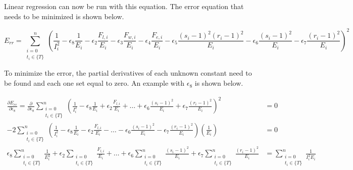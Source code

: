Linear regression can now be run with this equation. The error equation that needs to be minimized is shown below.

\begin{equation*}
	E_{rr}=\sum_{
            \substack{i=0\\ t_i\in \{ T \}}
        }^n \left(
        \frac{1}{I_i^2}
        -\epsilon_8 \frac{1}{E_i}
        -\epsilon_2 \frac{F_{l,i}}{E_i}
        -\epsilon_3 \frac{F_{w,i}}{E_i}
        -\epsilon_4 \frac{F_{e,i}}{E_i}
        -\epsilon_5 \frac{(s_i-1)^2(r_i-1)^2}{E_i}
        -\epsilon_6 \frac{(s_i-1)^2}{E_i}
        -\epsilon_7 \frac{(r_i-1)^2}{E_i}
    \right)^2
\end{equation*}

To minimize the error, the partial derivatives of each unknown constant need to be found and each one set equal to zero. An example with $\epsilon_8$ is shown below.

\begin{equation*}
    \begin{split}
        \frac{\partial E_{rr}}{\partial \epsilon_8}=
        \frac{\partial}{\partial \epsilon_8}\sum_{
                \substack{i=0\\ t_i\in \{ T \}}
            }^n \left(
            \frac{1}{I_i^2}
            -\epsilon_8 \frac{1}{E_i}
            +\epsilon_2 \frac{F_{l,i}}{E_i}
            +\dots
            +\epsilon_6 \frac{(s_i-1)^2}{E_i}
            +\epsilon_7 \frac{(r_i-1)^2}{E_i}
        \right)^2&=0
        \\
        -2\sum_{
                \substack{i=0\\ t_i\in \{ T \}}
            }^n \left(
            \frac{1}{I_i^2}
            -\epsilon_8 \frac{1}{E_i}
            -\epsilon_2 \frac{F_{l,i}}{E_i}
            -\dots
            -\epsilon_6 \frac{(s_i-1)^2}{E_i}
           	-\epsilon_7 \frac{(r_i-1)^2}{E_i}
        \right)\left( \frac{1}{E_i} \right)&=0 
        \\
        \epsilon_8 \sum_{\substack{i=0\\ t_i\in \{ T \}}}^n \frac{1}{E_i^2} 
        +\epsilon_2 \sum_{\substack{i=0\\ t_i\in \{ T \}}} \frac{F_{l,i}}{E_i}
        +\dots
        +\epsilon_6 \sum_{\substack{i=0\\ t_i\in \{ T \}}}^n \frac{(s_i-1)^2}{E_i}
        +\epsilon_7 \sum_{\substack{i=0\\ t_i\in \{ T \}}}^n \frac{(r_i-1)^2}{E_i}
        &=
        \sum_{\substack{i=0\\ t_i\in \{ T \}}}^n \frac{1}{I_i^2E_i}
        \\
    \end{split}
\end{equation*}

